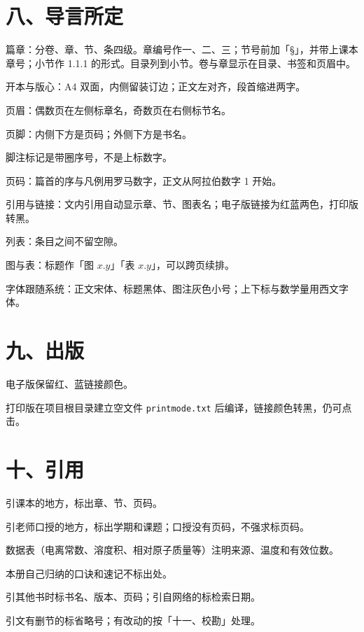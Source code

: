 \section*{八、导言所定}

\begin{fanli}
  \item 篇章：分卷、章、节、条四级。章编号作一、二、三；节号前加「§」，并带上课本章号；小节作 1.1.1 的形式。目录列到小节。卷与章显示在目录、书签和页眉中。
  \item 开本与版心：A4 双面，内侧留装订边；正文左对齐，段首缩进两字。
  \item 页眉：偶数页在左侧标章名，奇数页在右侧标节名。
  \item 页脚：内侧下方是页码；外侧下方是书名。
  \item 脚注标记是带圈序号，不是上标数字。
  \item 页码：篇首的序与凡例用罗马数字，正文从阿拉伯数字 1 开始。
  \item 引用与链接：文内引用自动显示章、节、图表名；电子版链接为红蓝两色，打印版转黑。
  \item 列表：条目之间不留空隙。
  \item 图与表：标题作「图 \(x.y\)」「表 \(x.y\)」，可以跨页续排。
  \item 字体跟随系统：正文宋体、标题黑体、图注灰色小号；上下标与数学量用西文字体。
\end{fanli}

\section*{九、出版}

\begin{fanli}
  \item 电子版保留红、蓝链接颜色。
  \item 打印版在项目根目录建立空文件 \verb|printmode.txt| 后编译，链接颜色转黑，仍可点击。
\end{fanli}

\section*{十、引用}

\begin{fanli}
  \item 引课本的地方，标出章、节、页码。
  \item 引老师口授的地方，标出学期和课题；口授没有页码，不强求标页码。
  \item 数据表（电离常数、溶度积、相对原子质量等）注明来源、温度和有效位数。
  \item 本册自己归纳的口诀和速记不标出处。
  \item 引其他书时标书名、版本、页码；引自网络的标检索日期。
  \item 引文有删节的标省略号；有改动的按「十一、校勘」处理。
\end{fanli}

